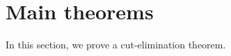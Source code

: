 \documentclass{llncs}
\renewcommand{\:}{\colon}
\begin{document}















\section{Main theorems}
In this section, we prove a cut-elimination theorem.
\end{document}
